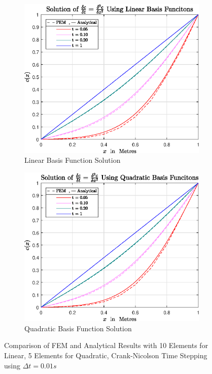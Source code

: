 \documentclass[11pt]{article}
\begin{document}
\begin{figure}[h!] 
        \centering
        \begin{subfigure}[b]{0.475\textwidth}
            \centering
            \includegraphics[width=\textwidth]{epsQ1a}
            \caption[]%
            {{\small Linear Basis Function Solution }}    
            \label{fig:q1alin}
        \end{subfigure}
        \hfill
        \begin{subfigure}[b]{0.475\textwidth}  
            \centering 
            \includegraphics[width=\textwidth]{epsQ1aQuad}
            \caption[]%
            {{\small Quadratic Basis Function Solution}}    
            \label{fig:q1aquad}
        \end{subfigure}
        \caption[ Comparison of FEM and Analytical Results Over Spatial Domain ]
        {\small Comparison of FEM  and Analytical Results with 10 Elements for Linear, 5 Elements for Quadratic, Crank-Nicolson Time Stepping using $\Delta t = 0.01s$} 
        \label{fig:q1a}
\end{figure}
\end{document}
